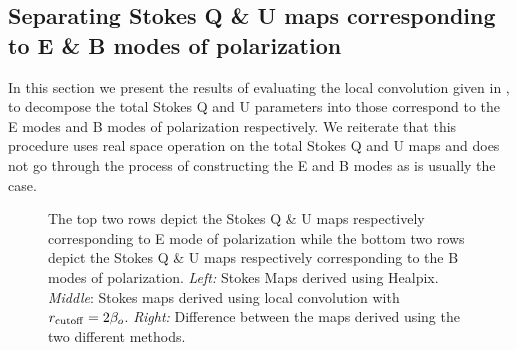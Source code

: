 \subsection{Separating Stokes Q \& U maps corresponding to E \& B modes of polarization}
In this section we present the results of evaluating the local convolution given in , to decompose the total Stokes Q and U parameters into those correspond to the E modes and B modes of polarization respectively. We reiterate that this procedure uses real space operation on the total Stokes Q and U maps and does not go through the process of constructing the E and B modes as is usually the case. 
%
\begin{figure}[!t] 
\centering
{}
\caption{The top two rows depict the Stokes Q \& U maps  respectively corresponding to E mode of polarization while the bottom two rows depict  the Stokes Q \& U maps  respectively corresponding to the  B modes of polarization. \textit{Left:} Stokes Maps derived using Healpix. \textit{Middle}: Stokes maps derived using local convolution with $r_{\rm cutoff} = 2 \beta_o$. \textit{Right:} Difference between the maps derived using the two different methods.}
\label{fig:equ-bqu-maps-compare}
\end{figure}
